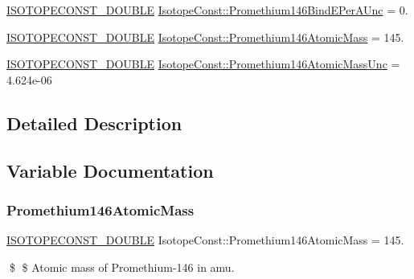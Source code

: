 \begin{DoxyCompactItemize}
\item 
\mbox{\hyperlink{group___isotope_const-_macros_ga8f45a7272ce02c0b4c65c44636ed719a}{I\+S\+O\+T\+O\+P\+E\+C\+O\+N\+S\+T\+\_\+\+D\+O\+U\+B\+LE}} \mbox{\hyperlink{group___isotope_const-_promethium-_pm146_ga66e4749070a2b4ec7d2f46fbc8608f0b}{Isotope\+Const\+::\+Promethium146\+Bind\+E\+Per\+A\+Unc}} = 0.
\item 
\mbox{\hyperlink{group___isotope_const-_macros_ga8f45a7272ce02c0b4c65c44636ed719a}{I\+S\+O\+T\+O\+P\+E\+C\+O\+N\+S\+T\+\_\+\+D\+O\+U\+B\+LE}} \mbox{\hyperlink{group___isotope_const-_promethium-_pm146_ga5ead4354c14ee6b9322775a03c3016b1}{Isotope\+Const\+::\+Promethium146\+Atomic\+Mass}} = 145.
\item 
\mbox{\hyperlink{group___isotope_const-_macros_ga8f45a7272ce02c0b4c65c44636ed719a}{I\+S\+O\+T\+O\+P\+E\+C\+O\+N\+S\+T\+\_\+\+D\+O\+U\+B\+LE}} \mbox{\hyperlink{group___isotope_const-_promethium-_pm146_ga306e40644d68ea6652358c19ccd5ddaf}{Isotope\+Const\+::\+Promethium146\+Atomic\+Mass\+Unc}} = 4.\+624e-\/06
\end{DoxyCompactItemize}


\subsection{Detailed Description}


\subsection{Variable Documentation}
\mbox{\label{group___isotope_const-_promethium-_pm146_ga5ead4354c14ee6b9322775a03c3016b1}} 
\subsubsection{\texorpdfstring{Promethium146\+Atomic\+Mass}{Promethium146AtomicMass}}
{\footnotesize\ttfamily \mbox{\hyperlink{group___isotope_const-_macros_ga8f45a7272ce02c0b4c65c44636ed719a}{I\+S\+O\+T\+O\+P\+E\+C\+O\+N\+S\+T\+\_\+\+D\+O\+U\+B\+LE}} Isotope\+Const\+::\+Promethium146\+Atomic\+Mass = 145.}

\$ \$ Atomic mass of Promethium-\/146 in amu. \mbox{\label{group___isotope_const-_promethium-_pm146_ga306e40644d68ea6652358c19ccd5ddaf}} 
